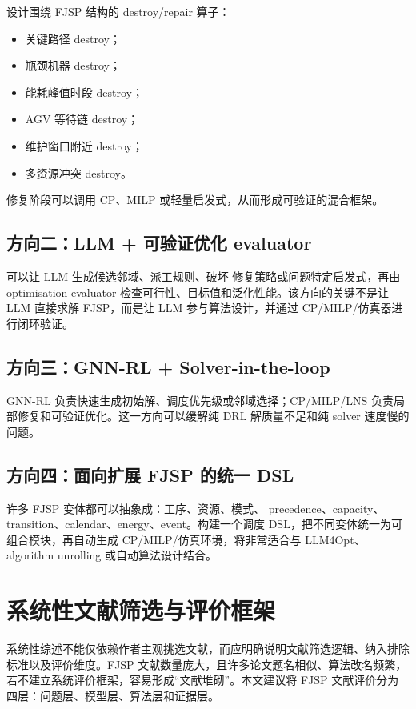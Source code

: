 \documentclass[UTF8,a4paper,11pt]{ctexart}
\begin{document}
设计围绕 FJSP 结构的 destroy/repair 算子：
\begin{itemize}
    \item 关键路径 destroy；
    \item 瓶颈机器 destroy；
    \item 能耗峰值时段 destroy；
    \item AGV 等待链 destroy；
    \item 维护窗口附近 destroy；
    \item 多资源冲突 destroy。
\end{itemize}
修复阶段可以调用 CP、MILP 或轻量启发式，从而形成可验证的混合框架。

\subsection{方向二：LLM + 可验证优化 evaluator}

可以让 LLM 生成候选邻域、派工规则、破坏-修复策略或问题特定启发式，再由 optimisation evaluator 检查可行性、目标值和泛化性能。该方向的关键不是让 LLM 直接求解 FJSP，而是让 LLM 参与算法设计，并通过 CP/MILP/仿真器进行闭环验证。

\subsection{方向三：GNN-RL + Solver-in-the-loop}

GNN-RL 负责快速生成初始解、调度优先级或邻域选择；CP/MILP/LNS 负责局部修复和可验证优化。这一方向可以缓解纯 DRL 解质量不足和纯 solver 速度慢的问题。

\subsection{方向四：面向扩展 FJSP 的统一 DSL}

许多 FJSP 变体都可以抽象成：工序、资源、模式、 precedence、capacity、transition、calendar、energy、event。构建一个调度 DSL，把不同变体统一为可组合模块，再自动生成 CP/MILP/仿真环境，将非常适合与 LLM4Opt、algorithm unrolling 或自动算法设计结合。



\section{系统性文献筛选与评价框架}

系统性综述不能仅依赖作者主观挑选文献，而应明确说明文献筛选逻辑、纳入排除标准以及评价维度。FJSP 文献数量庞大，且许多论文题名相似、算法改名频繁，若不建立系统评价框架，容易形成“文献堆砌”。本文建议将 FJSP 文献评价分为四层：问题层、模型层、算法层和证据层。
\end{document}
